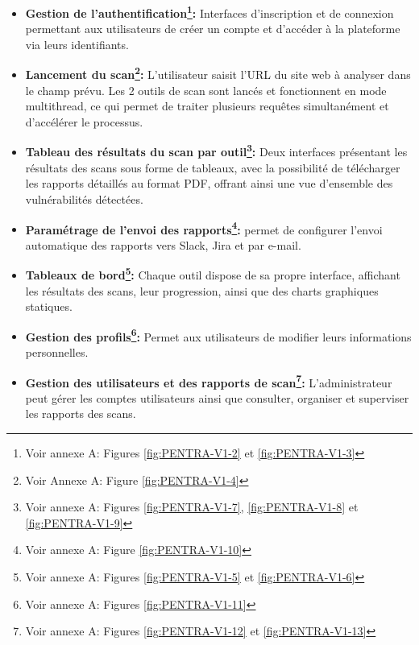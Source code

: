         \begin{itemize}[label=$\bullet$, left=0.2cm]
             \item \textbf{Gestion de l’authentification\footnote{Voir annexe A: Figures \ref{fig:PENTRA-V1-2} et \ref{fig:PENTRA-V1-3}}:} Interfaces d'inscription et de connexion permettant aux utilisateurs de créer un compte et d'accéder à la plateforme via leurs identifiants.
            \item \textbf{Lancement du scan\footnote{Voir Annexe A: Figure \ref{fig:PENTRA-V1-4}}:} L’utilisateur saisit l’URL du site web à analyser dans le champ prévu. Les 2 outils de scan sont lancés et fonctionnent en mode multithread, ce qui permet de traiter plusieurs requêtes simultanément et d’accélérer le processus.
            \item \textbf{Tableau des résultats du scan par outil\footnote{Voir annexe A: Figures \ref{fig:PENTRA-V1-7}, \ref{fig:PENTRA-V1-8} et \ref{fig:PENTRA-V1-9}}:} Deux interfaces présentant les résultats des scans sous forme de tableaux, avec la possibilité de télécharger les rapports détaillés au format PDF, offrant ainsi une vue d'ensemble des vulnérabilités détectées.
            \item \textbf{Paramétrage de l’envoi des rapports\footnote{Voir annexe A: Figure \ref{fig:PENTRA-V1-10}}:} permet de configurer l’envoi automatique des rapports vers Slack, Jira et par e-mail.
            \item \textbf{Tableaux de bord\footnote{Voir annexe A: Figures \ref{fig:PENTRA-V1-5} et \ref{fig:PENTRA-V1-6}}:} Chaque outil dispose de sa propre interface, affichant les résultats des scans, leur progression, ainsi que des charts graphiques statiques.
            \item \textbf{Gestion des profils\footnote{Voir annexe A: Figures \ref{fig:PENTRA-V1-11}}:} Permet aux utilisateurs de modifier leurs informations personnelles.
            \item \textbf{Gestion des utilisateurs et des rapports de scan\footnote{Voir annexe A: Figures \ref{fig:PENTRA-V1-12} et \ref{fig:PENTRA-V1-13}}:} L’administrateur peut gérer les comptes utilisateurs ainsi que consulter, organiser et superviser les rapports des scans.
        \end{itemize}
